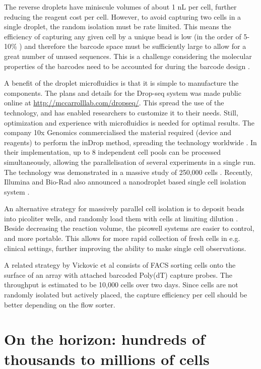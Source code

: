 The reverse droplets have miniscule volumes of about 1 nL per cell, further reducing the reagent cost per cell. However, to avoid capturing two cells in a single droplet, the random isolation must be rate limited. This means the efficiency of capturing any given cell by a unique bead is low (in the order of 5-10\% \cite{Klein2015-ti, Macosko2015-jb}) and therefore the barcode space must be sufficiently large to allow for a great number of unused sequences. This is a challenge considering the molecular properties of the barcodes need to be accounted for during the barcode design \cite{Costea2013-oj}.

A benefit of the droplet microfluidics is that it is simple to manufacture the components. The plans and details for the Drop-seq system was made public online at \url{http://mccarrolllab.com/dropseq/}. This spread the use of the technology, and has enabled researchers to customize it to their needs. Still, optimization and experience with microfluidics is needed for optimal results. The company 10x Genomics commercialised the material required (device and reagents) to perform the inDrop method, spreading the technology worldwide \cite{10x_Genomics_Inc2016-do}. In their implementation, up to 8 independent cell pools can be processed simultaneously, allowing the parallelisation of several experiments in a single run. The technology was demonstrated in a massive study of 250,000 cells \cite{Zheng2017-th}. Recently, Illumina and Bio-Rad also announced a nanodroplet based single cell isolation system \cite{Illumina_Inc2017-wj}.

An alternative strategy for massively parallel cell isolation is to deposit beads into picoliter wells, and randomly load them with cells at limiting dilution \cite{Christina_Fan2015-dy, Gierahn2017-xv, Bose2015-dt}. Beside decreasing the reaction volume, the picowell systems are easier to control, and more portable. This allows for more rapid collection of fresh cells in e.g. clinical settings, further improving the ability to make single cell observations.

A related strategy by Vickovic et al \cite{Vickovic2016-or} consists of FACS sorting cells onto the surface of an array with attached barcoded Poly(dT) capture probes. The throughput is estimated to be 10,000 cells over two days. Since cells are not randomly isolated but actively placed, the capture efficiency per cell should be better depending on the flow sorter.

\section{On the horizon: hundreds of thousands to millions of cells}

